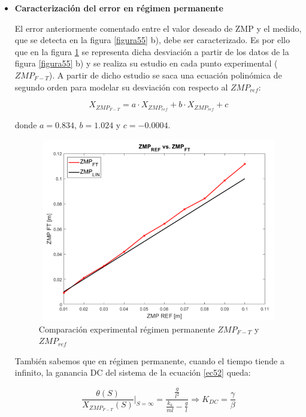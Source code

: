 \begin{itemize}

\item \textbf{Caracterización del error en régimen permanente}

El error anteriormente comentado entre el valor deseado de ZMP y el medido, que se detecta en la figura \ref{figura55} b), debe ser caracterizado. Es por ello que en la figura \ref{figura58} se representa dicha desviación a partir de los datos de la figura \ref{figura55} b) y se realiza su estudio en cada punto experimental ($ZMP_{F-T}$). A partir de dicho estudio se saca una ecuación polinómica de segundo orden para modelar su desviación con respecto al $ZMP_{ref}$:

\begin{equation}
X_{ZMP_{F-T}} = a \cdot X_{ZMP_{ref}} + b \cdot X_{ZMP_{ref}} + c
\label{ec53}
\end{equation}

donde $a=0.834$, $b=1.024$ y $c=-0.0004$.

\begin{figure}[H]
\centering
\includegraphics[width=13cm, height=8cm]{imagenes/apartado_5/58_evol_zmp_ft_vs_ref}
\caption{Comparación experimental régimen permanente $ZMP_{F-T}$ y $ZMP_{ref}$ \cite{ref21}}
\label{figura58}
\end{figure}

También sabemos que en régimen permanente, cuando el tiempo tiende a infinito, la ganancia DC del sistema de la ecuación \ref{ec52} queda:

\begin{equation}
\frac{\theta(S)}{X_{ZMP_{F-T}}(S)}|_{S=\infty}=\frac{\frac{g}{l^2}}{\frac{k_a}{ml} - \frac{g}{l}}\Rightarrow K_{DC}=\frac{\gamma}{\beta}
\label{ec54}
\end{equation}


\end{itemize}
